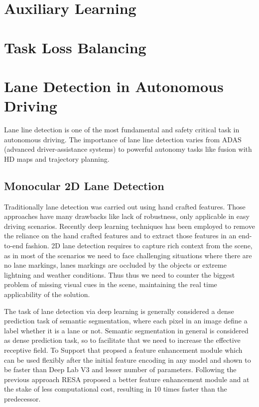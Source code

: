     \section{Auxiliary Learning}
    \section{Task Loss Balancing}
    \section{Lane Detection in Autonomous Driving}
    Lane line detection is one of the most fundamental and safety critical task in autonomous driving. The importance of lane line detection varies from ADAS (advanced driver-assistance systems) to powerful autonomy tasks like fusion with HD maps and trajectory planning.
        \subsection{Monocular 2D Lane Detection}
        Traditionally lane detection was carried out using hand crafted features. Those approaches have many drawbacks like lack of robustness, only applicable in easy driving scenarios. Recently deep learning techniques has been employed to remove the reliance on the hand crafted features and to extract those features in an end-to-end fashion. 2D lane detection requires to capture rich context from the scene, as in most of the scenarios we need to face challenging situations where there are no lane markings, lanes markings are occluded by the objects or extreme lightning and weather conditions. Thus thus we need to counter the biggest problem of missing visual cues in the scene, maintaining the real time applicability of the solution.
        
        The task of lane detection via deep learning is generally considered a dense prediction task of semantic segmentation, where each pixel in an image define a label whether it is a lane or not. Semantic segmentation in general is considered as dense prediction task, so to facilitate that we need to increase the effective receptive field. To Support that \cite{DBLP:journals/corr/abs-1712-06080} propsed a feature enhancement module which can be used flexibly after the initial feature encoding in any model and shown to be faster than Deep Lab V3 \cite{DBLP:journals/corr/ChenPSA17} and lesser number of parameters. Following the previous approach RESA \cite{DBLP:journals/corr/abs-2008-13719} proposed a better feature enhancement module and at the stake of less computational cost, resulting in 10 times faster than the predecessor. 
        
